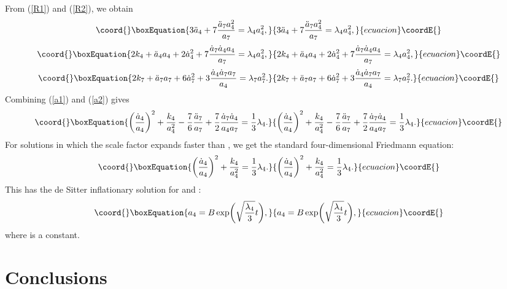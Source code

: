 \documentclass[a4paper,12pt]{article}
\begin{document}
From (\ref{R1}) and (\ref{R2}), we obtain
\begin{equation}\coord{}\boxEquation{
\label{a1}
3{\ddot a}_4+7\frac{{\ddot a}_7a^2_4}{a_7}=\lambda_4a^2_4,
}{
3{\ddot a}_4+7\frac{{\ddot a}_7a^2_4}{a_7}=\lambda_4a^2_4,
}{ecuacion}\coordE{}\end{equation}
\begin{equation}\coord{}\boxEquation{
\label{a2}
2k_4+{\ddot a}_4a_4+2{\dot a}^2_4+7\frac{{\dot a}_7{\dot
a}_4a_4}{a_7}=\lambda_4a^2_4,
}{
2k_4+{\ddot a}_4a_4+2{\dot a}^2_4+7\frac{{\dot a}_7{\dot
a}_4a_4}{a_7}=\lambda_4a^2_4,
}{ecuacion}\coordE{}\end{equation}
\begin{equation}\coord{}\boxEquation{
2k_7+{\ddot a}_7a_7+6{\dot a}^2_7
+3\frac{{\dot a}_4{\dot a}_7a_7}{a_4}=\lambda_7a^2_7.
}{
2k_7+{\ddot a}_7a_7+6{\dot a}^2_7
+3\frac{{\dot a}_4{\dot a}_7a_7}{a_4}=\lambda_7a^2_7.
}{ecuacion}\coordE{}\end{equation}
Combining (\ref{a1}) and (\ref{a2}) gives
\begin{equation}\coord{}\boxEquation{
\biggl(\frac{{\dot a}_4}{a_4}\biggr)^2+\frac{k_4}{a^2_4}
-\frac{7}{6}\frac{{\ddot a}_7}{a_7}
+\frac{7}{2}\frac{{\dot a}_7{\dot a}_4}{a_4a_7}=\frac{1}{3}\lambda_4.
}{
\biggl(\frac{{\dot a}_4}{a_4}\biggr)^2+\frac{k_4}{a^2_4}
-\frac{7}{6}\frac{{\ddot a}_7}{a_7}
+\frac{7}{2}\frac{{\dot a}_7{\dot a}_4}{a_4a_7}=\frac{1}{3}\lambda_4.
}{ecuacion}\coordE{}\end{equation}
For solutions in which the scale factor \coordHE{} expands
faster than \coordHE{}, we get the standard four-dimensional Friedmann equation:
\begin{equation}\coord{}\boxEquation{
\biggl(\frac{{\dot a}_4}{a_4}\biggr)^2
+\frac{k_4}{a^2_4}=\frac{1}{3}\lambda_4.
}{
\biggl(\frac{{\dot a}_4}{a_4}\biggr)^2
+\frac{k_4}{a^2_4}=\frac{1}{3}\lambda_4.
}{ecuacion}\coordE{}\end{equation}
This has the de Sitter inflationary solution for \coordHE{} and \coordHE{}:
\begin{equation}\coord{}\boxEquation{
a_4=B\exp\biggl(\sqrt{\frac{\lambda_4}{3}}t\biggr),
}{
a_4=B\exp\biggl(\sqrt{\frac{\lambda_4}{3}}t\biggr),
}{ecuacion}\coordE{}\end{equation}
where \coordHE{} is a constant.

\section{Conclusions}
\end{document}
